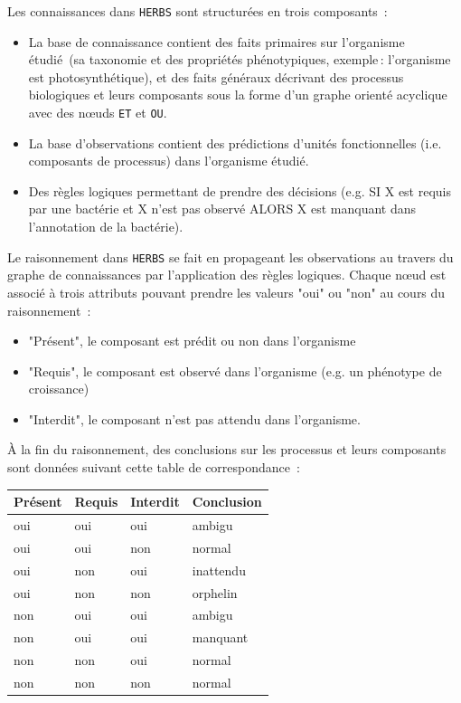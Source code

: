 \begin{refsegment}
Les connaissances dans \texttt{HERBS} sont structurées en trois composants :\nolisttopbreak
\begin{itemize}
    \item La base de connaissance contient des faits primaires sur l'organisme étudié (sa taxonomie  et des propriétés phénotypiques, exemple : l'organisme est photosynthétique), et des faits généraux décrivant des processus biologiques et leurs composants sous la forme d'un  graphe orienté acyclique avec des nœuds \texttt{ET} et \texttt{OU}.
    \item La base d'observations contient des prédictions d'unités fonctionnelles (i.e. composants de processus) dans l'organisme étudié.
    \item Des règles logiques permettant de prendre des décisions (e.g. SI X est requis par une bactérie et X n'est pas observé ALORS X est manquant dans l'annotation de la bactérie).
\end{itemize}

Le raisonnement dans \texttt{HERBS} se fait en propageant les observations au travers du graphe de connaissances par l'application des règles logiques. Chaque nœud est associé à trois attributs pouvant prendre les valeurs "oui" ou "non" au cours du raisonnement :\nolisttopbreak
\begin{itemize}
    \item "Présent", le composant est prédit ou non dans l'organisme
    \item "Requis", le composant est observé dans l'organisme (e.g. un phénotype de croissance)
    \item "Interdit", le composant n'est pas attendu dans l'organisme.
\end{itemize}

À la fin du raisonnement, des conclusions sur les processus et leurs composants sont données suivant cette table de correspondance :\nolisttopbreak
\begin{table}[H]
    \centering
    \label{tab:herbs_conclusion}
    \begin{tabular}{|l|l|l|>{\columncolor{LightCyan}}l|}
        \toprule
        \rowcolor{LightCyan}
        \textbf{Présent} & \textbf{Requis} & \textbf{Interdit} & \textbf{Conclusion} \\ 
        \midrule
        oui & oui & oui & ambigu \\ 
        \hline 
        oui & oui & non & normal \\ 
        \hline 
        oui & non & oui & inattendu \\ 
        \hline 
        oui & non & non & orphelin \\ 
        \hline 
        non & oui & oui & ambigu \\ 
        \hline 
        non & oui & oui & manquant \\ 
        \hline 
        non & non & oui & normal \\ 
        \hline 
        non & non & non & normal \\ 
        \bottomrule
    \end{tabular} 
\end{table}


\end{refsegment}
